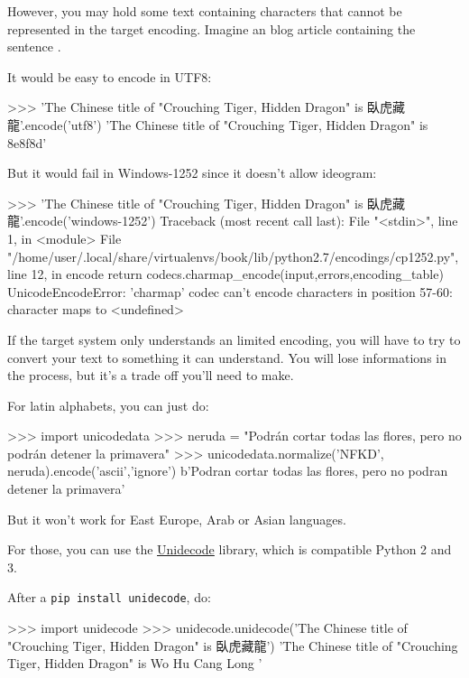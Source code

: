 However, you may hold some text containing characters that cannot be represented in the target encoding. Imagine an blog article containing the sentence .

It would be easy to encode in UTF8:

\begin{py3}
>>> 'The Chinese title of "Crouching Tiger, Hidden Dragon" is 臥虎藏龍'.encode('utf8')
'The Chinese title of "Crouching Tiger, Hidden Dragon" is \x8e\x8f\xbe\x8d'
\end{py3}

But it would fail in Windows-1252 since it doesn't allow ideogram:

\begin{py3}
>>> 'The Chinese title of "Crouching Tiger, Hidden Dragon" is 臥虎藏龍'.encode('windows-1252')
Traceback (most recent call last):
    File "<stdin>", line 1, in <module>
    File "/home/user/.local/share/virtualenvs/book/lib/python2.7/encodings/cp1252.py", line 12, in encode
    return codecs.charmap_encode(input,errors,encoding_table)
UnicodeEncodeError: 'charmap' codec can't encode characters in position 57-60: character maps to <undefined>
\end{py3}

If the target system only understands an limited encoding, you will have to try to convert your text to something it can understand. You will lose informations in the process, but it's a trade off you'll need to make.

For latin alphabets, you can just do:

\begin{py3}
>>> import unicodedata
>>> neruda = "Podrán cortar todas las flores, pero no podrán detener la primavera"
>>> unicodedata.normalize('NFKD', neruda).encode('ascii','ignore')
b'Podran cortar todas las flores, pero no podran detener la primavera'
\end{py3}

But it won't work for East Europe, Arab or Asian languages.

For those, you can use the \href{https://pypi.org/project/Unidecode/}{Unidecode} library, which is compatible Python 2 and 3.

After a \lstinline{pip install unidecode}, do:

\begin{py3}
>>> import unidecode
>>> unidecode.unidecode('The Chinese title of "Crouching Tiger, Hidden Dragon" is 臥虎藏龍')
'The Chinese title of "Crouching Tiger, Hidden Dragon" is Wo Hu Cang Long '
\end{py3}

